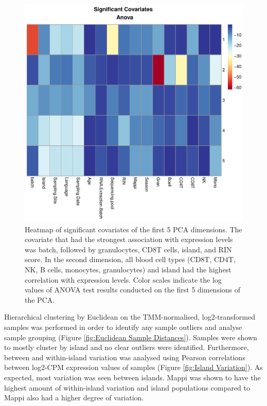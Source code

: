 \documentclass[12pt,a4paper,titlepage,twoside,openright]{book}
\begin{document}
\begin{mainmatter}
{\begin{figure}[htb!]
\centering
\includegraphics[width=\textwidth,height=\textheight,keepaspectratio]{Figures/significantCovariates_AnovaHeatmap.pdf}
\caption{Heatmap of significant covariates of the first 5 PCA dimensions. The covariate that had the strongest association with expression levels was batch, followed by granulocytes, CD8T cells, island, and RIN score. In the second dimension, all blood cell types (CD8T, CD4T, NK, B cells, monocytes, granulocytes) and island had the highest correlation with expression levels. Color scales indicate the log values of ANOVA test results conducted on the first 5 dimensions of the PCA.}
\label{fig:Significant Covariates}
\end{figure}

Hierarchical clustering by Euclidean on the TMM-normalised, log2-transformed samples was performed in order to identify any sample outliers and analyse sample grouping (﻿Figure \ref{fig:Euclidean Sample Distances}﻿). Samples were shown to mostly cluster by island and no clear outliers were identified. Furthermore, between and within-island variation was analysed using Pearson correlations between log2-CPM expression values of samples (﻿Figure \ref{fig:Island Variation}). As expected, most variation was seen between islands. Mappi was shown to have the highest amount of within-island variation and island populations compared to Mappi also had a higher degree of variation. 

}
\end{mainmatter}
\end{document}
